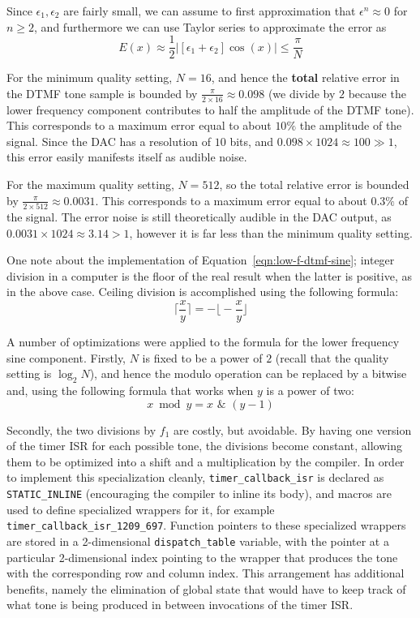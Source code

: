 \documentclass[11pt,a4paper,twocolumn]{scrartcl}
\begin{document}
Since $\epsilon_1, \epsilon_2$ are fairly small, we can assume to first approximation that $\epsilon^n \approx 0$ for $n \ge 2$, and furthermore we can use Taylor series to approximate the error as
$$ E(x) \approx \frac{1}{2}\bigg|[\epsilon_1 + \epsilon_2]\cos(x)\bigg| \le \frac{\pi}{N} $$

For the minimum quality setting, $N = 16$, and hence the \textbf{total} relative error in the DTMF tone sample is bounded by $\frac{\pi}{2\times 16} \approx 0.098$ (we divide by $2$ because the lower frequency component contributes to half the amplitude of the DTMF tone). This corresponds to a maximum error equal to about $10\%$ the amplitude of the signal. Since the DAC has a resolution of $10$ bits, and $0.098 \times 1024 \approx 100 \gg 1$, this error easily manifests itself as audible noise. 

For the maximum quality setting, $N = 512$, so the total relative error is bounded by $\frac{\pi}{2\times 512} \approx 0.0031$. This corresponds to a maximum error equal to about $0.3\%$ of the signal. The error noise is still theoretically audible in the DAC output, as $0.0031 \times 1024 \approx 3.14 > 1$, however it is far less than the minimum quality setting.

One note about the implementation of Equation~\ref{eqn:low-f-dtmf-sine}; integer division in a computer is the floor of the real result when the latter is positive, as in the above case. Ceiling division is accomplished using the following formula\cite{warren2012hacker}:
$$ \bigg\lceil \frac{x}{y} \bigg\rceil = -\bigg\lfloor -\frac{x}{y} \bigg\rfloor $$

A number of optimizations were applied to the formula for the lower frequency sine component. Firstly, $N$ is fixed to be a power of $2$ (recall that the quality setting is $\log_2 N$), and hence the modulo operation can be replaced by a bitwise and, using the following formula that works when $y$ is a power of two:
$$ x \bmod y = x \,\,\&\,\, (y - 1) $$

Secondly, the two divisions by $f_1$ are costly, but avoidable. By having one version of the timer ISR for each possible tone, the divisions become constant, allowing them to be optimized into a shift and a multiplication by the compiler\cite{warren2012hacker}. In order to implement this specialization cleanly, \verb!timer_callback_isr! is declared as \verb!STATIC_INLINE! (encouraging the compiler to inline its body), and macros are used to define specialized wrappers for it, for example \verb!timer_callback_isr_1209_697!. Function pointers to these specialized wrappers are stored in a 2-dimensional \verb!dispatch_table! variable, with the pointer at a particular 2-dimensional index pointing to the wrapper that produces the tone with the corresponding row and column index. This arrangement has additional benefits, namely the elimination of global state that would have to keep track of what tone is being produced in between invocations of the timer ISR.
\end{document}
